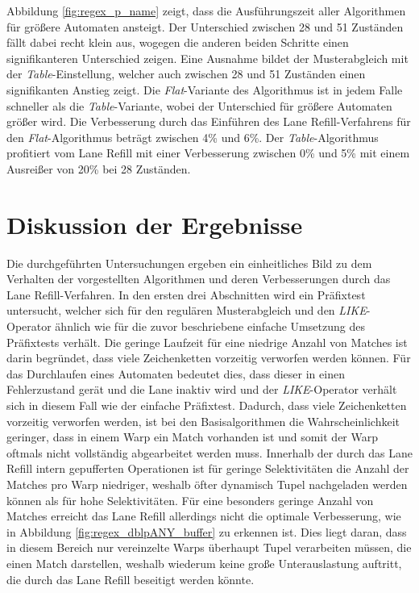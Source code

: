 Abbildung \ref{fig:regex_p_name} zeigt, dass die Ausführungszeit aller Algorithmen für größere Automaten ansteigt.
Der Unterschied zwischen 28 und 51 Zuständen fällt dabei recht klein aus, wogegen die anderen beiden Schritte einen signifikanteren Unterschied zeigen.
Eine Ausnahme bildet der Musterabgleich mit der \emph{Table}-Einstellung, welcher auch zwischen 28 und 51 Zuständen einen signifikanten Anstieg zeigt.
Die \emph{Flat}-Variante des Algorithmus ist in jedem Falle schneller als die \emph{Table}-Variante, wobei der Unterschied für größere Automaten größer wird.
Die Verbesserung durch das Einführen des Lane Refill-Verfahrens für den \emph{Flat}-Algorithmus beträgt zwischen 4\% und 6\%.
Der \emph{Table}-Algorithmus profitiert vom Lane Refill mit einer Verbesserung zwischen 0\% und 5\% mit einem Ausreißer von 20\% bei 28 Zuständen.

\section{Diskussion der Ergebnisse}

Die durchgeführten Untersuchungen ergeben ein einheitliches Bild zu dem Verhalten der vorgestellten Algorithmen und deren Verbesserungen durch das Lane Refill-Verfahren.
In den ersten drei Abschnitten wird ein Präfixtest untersucht, welcher sich für den regulären Musterabgleich und den \emph{LIKE}-Operator ähnlich wie für die zuvor beschriebene einfache Umsetzung des Präfixtests verhält.
Die geringe Laufzeit für eine niedrige Anzahl von Matches ist darin begründet, dass viele Zeichenketten vorzeitig verworfen werden können.
Für das Durchlaufen eines Automaten bedeutet dies, dass dieser in einen Fehlerzustand gerät und die Lane inaktiv wird und der \emph{LIKE}-Operator verhält sich in diesem Fall wie der einfache Präfixtest.
Dadurch, dass viele Zeichenketten vorzeitig verworfen werden, ist bei den Basisalgorithmen die Wahrscheinlichkeit geringer, dass in einem Warp ein Match vorhanden ist und somit der Warp oftmals nicht vollständig abgearbeitet werden muss.
Innerhalb der durch das Lane Refill intern gepufferten Operationen ist für geringe Selektivitäten die Anzahl der Matches pro Warp niedriger, weshalb öfter dynamisch Tupel nachgeladen werden können als für hohe Selektivitäten.
Für eine besonders geringe Anzahl von Matches erreicht das Lane Refill allerdings nicht die optimale Verbesserung, wie in Abbildung \ref{fig:regex_dblpANY_buffer} zu erkennen ist.
Dies liegt daran, dass in diesem Bereich nur vereinzelte Warps überhaupt Tupel verarbeiten müssen, die einen Match darstellen, weshalb wiederum keine große Unterauslastung auftritt, die durch das Lane Refill beseitigt werden könnte.

